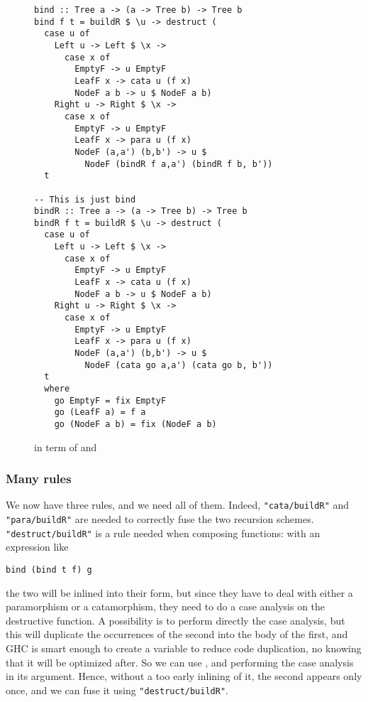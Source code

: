 
\begin{figure}
\begin{verbatim}
bind :: Tree a -> (a -> Tree b) -> Tree b
bind f t = buildR $ \u -> destruct (
  case u of
    Left u -> Left $ \x -> 
      case x of
        EmptyF -> u EmptyF
        LeafF x -> cata u (f x)
        NodeF a b -> u $ NodeF a b)
    Right u -> Right $ \x ->
      case x of
        EmptyF -> u EmptyF
        LeafF x -> para u (f x)
        NodeF (a,a') (b,b') -> u $
          NodeF (bindR f a,a') (bindR f b, b'))
  t

-- This is just bind
bindR :: Tree a -> (a -> Tree b) -> Tree b
bindR f t = buildR $ \u -> destruct (
  case u of
    Left u -> Left $ \x -> 
      case x of
        EmptyF -> u EmptyF
        LeafF x -> cata u (f x)
        NodeF a b -> u $ NodeF a b)
    Right u -> Right $ \x ->
      case x of
        EmptyF -> u EmptyF
        LeafF x -> para u (f x)
        NodeF (a,a') (b,b') -> u $
          NodeF (cata go a,a') (cata go b, b'))
  t
  where
    go EmptyF = fix EmptyF
    go (LeafF a) = f a
    go (NodeF a b) = fix (NodeF a b)

\end{verbatim}
\caption{ in term of  and }
\label{fig:bindbuild}
\end{figure}

\subsubsection{Many rules}
We now have three rules, and we need all of them. Indeed, \verb|"cata/buildR"| and \verb|"para/buildR"| are needed to correctly fuse the two recursion schemes. \verb|"destruct/buildR"| is a rule needed when composing functions: with an expression like
\begin{verbatim}
bind (bind t f) g
\end{verbatim}
\noindent the two  will be inlined into their  form, but since they have to deal with either a paramorphism or a catamorphism, they need to do a case analysis on the destructive function. A possibility is to perform directly the case analysis, but this will duplicate the occurrences of the second  into the body of the first, and GHC is smart enough to create a variable to reduce code duplication, no knowing that it will be optimized after. So we can use , and performing the case analysis in its argument. Hence, without a too early inlining of it, the second  appears only once, and we can fuse it using \verb|"destruct/buildR"|.

